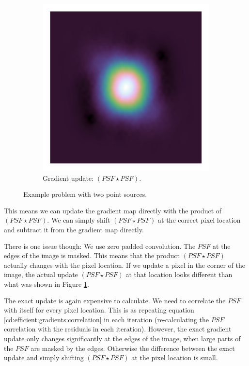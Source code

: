 \begin{figure}[!h]
\begin{subfigure}[b]{0.3\linewidth}
		\includegraphics[width=\linewidth, clip, trim= 0.25in 0.25in 0.25in 0.25in]{./chapters/03.cd/simulated/psfSquared.png}
		\caption{Gradient update: $(PSF \star PSF)$.}
		\label{cd:efficient:update:psf}
	\end{subfigure}
	\caption{Example problem with two point sources.}
	\label{cd:efficient:update:figure}
\end{figure}

This means we can update the gradient map directly with the product of $(PSF \star PSF)$. We can simply shift $(PSF \star PSF)$ at the correct pixel location and subtract it from the gradient map directly.

There is one issue though: We use zero padded convolution. The $PSF$ at the edges of the image is masked. This means that the product $(PSF \star PSF)$ actually changes with the pixel location. If we update a pixel in the corner of the image, the actual update $(PSF \star PSF)$ at that location looks different than what was shown in Figure \ref{cd:efficient:update:psf}.

The exact update is again expensive to calculate. We need to correlate the $PSF$ with itself for every pixel location. This is as repeating equation \eqref{cd:efficient:gradients:correlation} in each iteration (re-calculating the $PSF$ correlation with the residuals in each iteration). However, the exact gradient update only changes significantly at the edges of the image, when large parts of the $PSF$ are masked by the edges. Otherwise the difference between the exact update and simply shifting $(PSF \star PSF)$ at the pixel location is small.

